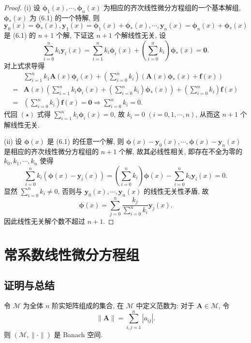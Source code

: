 \begin{proof}
  (i) 设 $\bm{\phi}_1(x),\cdots,\bm{\phi}_n(x)$ 为相应的齐次线性微分方程组的一个基本解组, 
  $\bm{\phi}_*(x)$ 为 (6.1) 的一个特解, 
  则 $\bm{y}_0(x)=\bm{\phi}_*(x),\bm{y}_1(x)=\bm{\phi}_1(x)+\bm{\phi}_*(x),\cdots,\bm{y}_n(x)=\bm{\phi}_n(x)+\bm{\phi}_*(x)$
  是 (6.1) 的 $n+1$ 个解, 下证这 $n+1$ 个解线性无关, 设
  \begin{equation}
    \sum_{i=0}^nk_i\bm{y}_i(x)=\sum_{i=1}^nk_i\bm{\phi}_i(x)+\left(\sum_{i=0}^nk_i\right)\bm{\phi}_*(x)
      = \bm{0}.\tag{$\star$}
  \end{equation}
  对上式求导得
  \begin{align*}
    & \sum_{i=1}^nk_1\bm{A}(x)\bm{\phi}_i(x)+\left(\sum_{i=0}^nk_i\right)\left(\bm{A}(x)\bm{\phi}_*(x)+\bm{f}(x)\right)\\
    ={} & \bm{A}(x)\left(\sum_{i=1}^nk_i\bm{\phi}_i(x)+\left(\sum_{i=0}^nk_i\right)\bm{\phi}_*(x)\right)+\left(\sum_{i=0}^nk_i\right)\bm{f}(x)\\
    ={} & \left(\sum_{i=0}^nk_i\right)\bm{f}(x)=\bm{0}\Rightarrow\sum_{i=0}^nk_i=0.
  \end{align*}
  代回 $(\star)$ 式得 $\sum_{i=1}^nk_i\bm{\phi}_i(x)=0$, 
  故 $k_i=0$ $(i=0,1,\cdots,n)$, 从而这 $n+1$ 个解线性无关.

  (ii) 设 $\bm{\phi}(x)$ 是 (6.1) 的任意一个解, 
  则 $\bm{\phi}(x)-\bm{y}_0(x),\cdots,\bm{\phi}(x)-\bm{y}_n(x)$
  是相应的齐次线性微分方程组的 $n+1$ 个解, 故其必线性相关, 即存在不全为零的 $k_0,k_1,\cdots,k_n$ 使得
  \[\sum_{i=0}^nk_i(\bm{\phi}(x)-\bm{y}_i(x))
    = \left(\sum_{i=0}^nk_i\right)\bm{\phi}(x)-\sum_{i=0}^nk_i\bm{y}_i(x)=0.\]
  显然 $\sum_{i=0}^nk_i\neq 0$, 否则与 $\bm{y}_0(x),\cdots,\bm{y}_n(x)$ 的线性无关性矛盾, 故
  \[\bm{\phi}(x)=\sum_{j=0}^n\frac{k_j}{\sum_{i=0}^nk_i}\bm{y}_j(x).\]
  因此线性无关解个数不超过 $n+1$.
\end{proof}



\section{常系数线性微分方程组}



\subsection{证明与总结}



\begin{conclusion}[教材 Page 170]
  令 $\mathcal{M}$ 为全体 $n$ 阶实矩阵组成的集合,
  在 $\mathcal{M}$ 中定义范数为: 对于 $\bm{A}\in\mathcal{M}$, 令
  \[\|\bm{A}\| = \sum_{i,j=1}^n |a_{ij}|.\]
  则 $(\mathcal{M},\|\cdot\|)$ 是 Banach 空间.
\end{conclusion}

